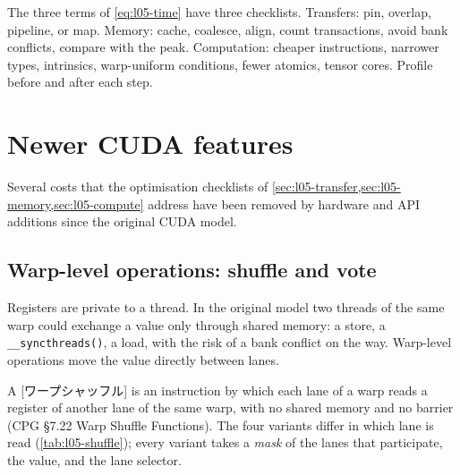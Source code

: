 \documentclass[../main.tex]{subfiles}
\begin{document}
\begin{keypoint}
  The three terms of \cref{eq:l05-time} have three checklists.
  Transfers: pin, overlap, pipeline, or map.  Memory: cache, coalesce,
  align, count transactions, avoid bank conflicts, compare with the
  peak.  Computation: cheaper instructions, narrower types, intrinsics,
  warp-uniform conditions, fewer atomics, tensor cores.  Profile before
  and after each step.
\end{keypoint}

\section{Newer CUDA features}
\label{sec:l05-features}

Several costs that the optimisation checklists of
\cref{sec:l05-transfer,sec:l05-memory,sec:l05-compute} address have been
removed by hardware and API additions since the original CUDA model.

\subsection{Warp-level operations: shuffle and vote}

Registers are private to a thread.  In the original model two threads of
the same warp could exchange a value only through shared memory: a store,
a \texttt{\_\_syncthreads()}, a load, with the risk of a bank conflict
on the way.  Warp-level operations move the value directly between
lanes.

\begin{definition}
  A [ワープシャッフル] is an instruction by which each
  lane of a warp reads a register of another lane of the same warp,
  with no shared memory and no barrier (CPG §7.22 Warp Shuffle
  Functions).  The four variants differ in which lane is read
  (\cref{tab:l05-shuffle}); every variant takes a \emph{mask} of the
  lanes that participate, the value, and the lane selector.
\end{definition}
\end{document}

